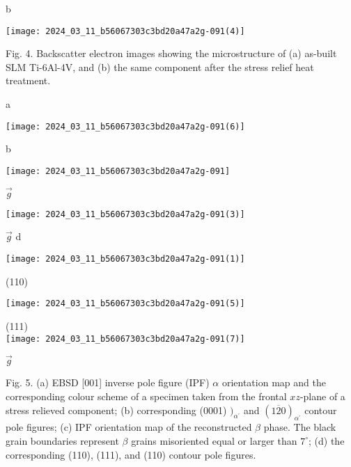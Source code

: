\documentclass[10pt]{article}
\begin{document}
b

\begin{center}
\texttt{[image: 2024\_03\_11\_b56067303c3bd20a47a2g-091(4)]}
\end{center}

Fig. 4. Backscatter electron images showing the microstructure of (a) as-built SLM Ti-6Al-4V, and (b) the same component after the stress relief heat treatment.

a

\begin{center}
\texttt{[image: 2024\_03\_11\_b56067303c3bd20a47a2g-091(6)]}
\end{center}

b

\begin{center}
\texttt{[image: 2024\_03\_11\_b56067303c3bd20a47a2g-091]}
\end{center}

$\vec{g}$

\begin{center}
\texttt{[image: 2024\_03\_11\_b56067303c3bd20a47a2g-091(3)]}
\end{center}

$\vec{g}$ d

\begin{center}
\texttt{[image: 2024\_03\_11\_b56067303c3bd20a47a2g-091(1)]}
\end{center}

(110)

\begin{center}
\texttt{[image: 2024\_03\_11\_b56067303c3bd20a47a2g-091(5)]}
\end{center}

(111)\\
\texttt{[image: 2024\_03\_11\_b56067303c3bd20a47a2g-091(7)]}

$\vec{g}$

Fig. 5. (a) EBSD [001] inverse pole figure (IPF) $\alpha$ orientation map and the corresponding colour scheme of a specimen taken from the frontal $x z$-plane of a stress relieved component; (b) corresponding (0001) $)_{\alpha^{\prime}}$ and $(1 \overline{2} 0)_{\alpha^{\prime}}$ contour pole figures; (c) IPF orientation map of the reconstructed $\beta$ phase. The black grain boundaries represent $\beta$ grains misoriented equal or larger than $7^{\circ}$; (d) the corresponding (110), (111), and (110) contour pole figures.
\end{document}
